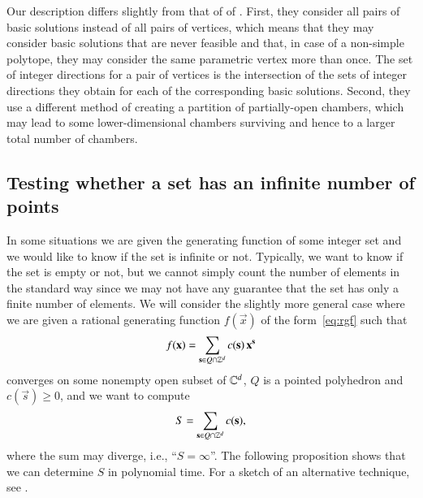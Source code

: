 Our description differs slightly from that of
of .
First, they consider all pairs of basic solutions instead
of all pairs of vertices, which means that they may
consider basic solutions that are never feasible and that,
in case of a non-simple polytope,
they may consider the same parametric vertex more than once.
The set of integer
directions for a pair of vertices is the intersection of
the sets of integer directions they obtain for each of
the corresponding basic solutions.
Second, they use a different method of creating a partition
of partially-open chambers, which may lead to some lower-dimensional
chambers surviving and hence to a larger total number of chambers.


\subsection{Testing whether a set has an infinite number of points}
\label{s:infinite}

In some situations we are given the generating function of
some integer set and we would like to know if the set is
infinite or not.  Typically, we want to know if the set
is empty or not, but we cannot simply count the number of elements
in the standard way since we may not have any guarantee that
the set has only a finite number of elements.
We will consider the slightly more general case where we are
given a rational generating function $f(\vec x)$ of the form~\eqref{eq:rgf}
such that
\begin{equation}
\label{eq:rgf:psp}
f(\vec x) = \sum_{\vec s \in Q \cap \ZZ^d} c(\vec s)\, \vec x^{\vec s}
\end{equation}
converges on some nonempty open subset of $\mathbb{C}^d$, $Q$ is a pointed
polyhedron and $c(\vec s) \ge 0$,
and we want to compute
\begin{equation}
\label{eq:psp:sum}
S = \sum_{\vec s \in Q \cap \ZZ^d} c(\vec s)
,
\end{equation}
where the sum may diverge, i.e., ``$S = \infty$''.
The following proposition shows that we can determine $S$
in polynomial time.
For a sketch of an alternative technique, see
.

